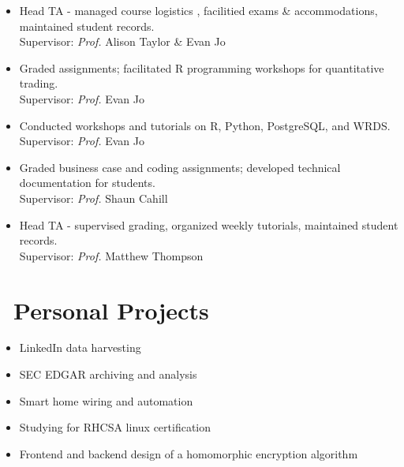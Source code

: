 \documentclass{resume}
\begin{document}
\begin{itemize}
  \item {}
  {Head TA - managed course logistics , facilitied exams \& accommodations, maintained student records.}\\
  {Supervisor: \emph{Prof.} Alison Taylor \& Evan Jo}\\
  \vspace{-0.5em}
  
  \item {}
  {Graded assignments; facilitated R programming workshops for quantitative trading. }\\
  {Supervisor: \emph{Prof.} Evan Jo}\\
  \vspace{-0.5em}
  
  \item {}
  {Conducted workshops and tutorials on R, Python, PostgreSQL, and WRDS.}\\
  {Supervisor: \emph{Prof.} Evan Jo}\\
  \vspace{-0.5em}
  
  \item {}
  {Graded business case and coding assignments; developed technical documentation for students.}\\
  {Supervisor: \emph{Prof.} Shaun Cahill}\\
  \vspace{-0.5em}
    
  \item {}
  {Head TA - supervised grading, organized weekly tutorials, maintained student records.}\\
  {Supervisor: \emph{Prof.} Matthew Thompson}\\
  \vspace{-0.5em}
  
\end{itemize}




\section{\faUser\ Personal Projects}
\begin{itemize}[parsep=0.5ex]
  \item LinkedIn data harvesting
  \item SEC EDGAR archiving and analysis
  \item Smart home wiring and automation
  \item Studying for RHCSA linux certification 
  \item Frontend and backend design of a homomorphic encryption algorithm
\end{itemize}
\end{document}
